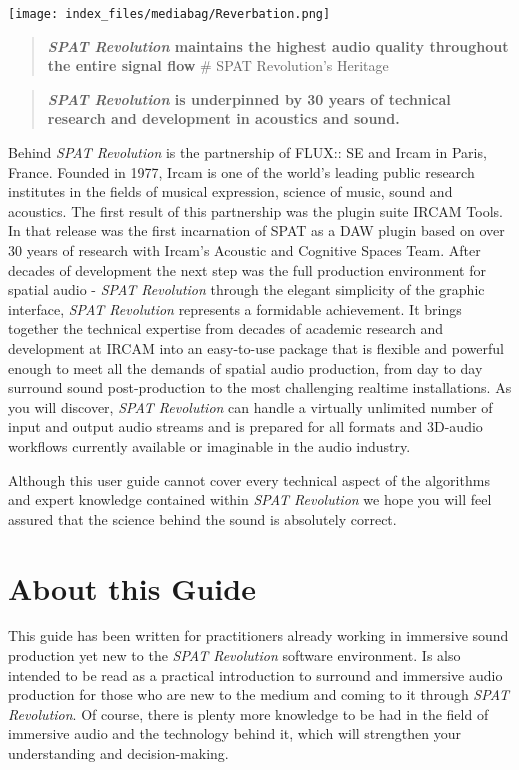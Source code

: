 \documentclass[
  letterpaper,
  DIV=11,
  numbers=noendperiod]{scrreport}
\begin{document}
\texttt{[image: index\_files/mediabag/Reverbation.png]}

\begin{quote}
\textbf{\emph{SPAT Revolution} maintains the highest audio quality
throughout the entire signal flow} \# SPAT Revolution's Heritage
\end{quote}

\begin{quote}
\textbf{\emph{SPAT Revolution} is underpinned by 30 years of technical
research and development in acoustics and sound.}
\end{quote}

Behind \emph{SPAT Revolution} is the partnership of FLUX:: SE and Ircam
in Paris, France. Founded in 1977, Ircam is one of the world's leading
public research institutes in the fields of musical expression, science
of music, sound and acoustics. The first result of this partnership was
the plugin suite IRCAM Tools. In that release was the first incarnation
of SPAT as a DAW plugin based on over 30 years of research with Ircam's
Acoustic and Cognitive Spaces Team. After decades of development the
next step was the full production environment for spatial audio -
\emph{SPAT Revolution} through the elegant simplicity of the graphic
interface, \emph{SPAT Revolution} represents a formidable achievement.
It brings together the technical expertise from decades of academic
research and development at IRCAM into an easy-to-use package that is
flexible and powerful enough to meet all the demands of spatial audio
production, from day to day surround sound post-production to the most
challenging realtime installations. As you will discover, \emph{SPAT
Revolution} can handle a virtually unlimited number of input and output
audio streams and is prepared for all formats and 3D-audio workflows
currently available or imaginable in the audio industry.

Although this user guide cannot cover every technical aspect of the
algorithms and expert knowledge contained within \emph{SPAT Revolution}
we hope you will feel assured that the science behind the sound is
absolutely correct.


\hypertarget{about-this-guide}{%
\chapter{About this Guide}\label{about-this-guide}}

This guide has been written for practitioners already working in
immersive sound production yet new to the \emph{SPAT Revolution}
software environment. Is also intended to be read as a practical
introduction to surround and immersive audio production for those who
are new to the medium and coming to it through \emph{SPAT Revolution}.
Of course, there is plenty more knowledge to be had in the field of
immersive audio and the technology behind it, which will strengthen your
understanding and decision-making.
\end{document}
